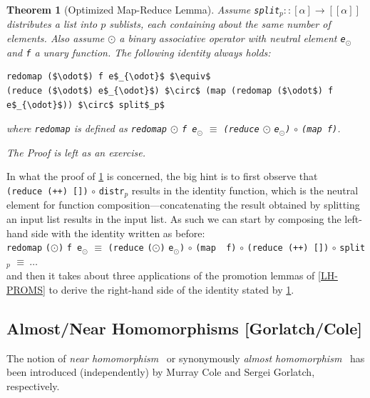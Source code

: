 \documentclass[acmsmall,review]{acmart}\settopmatter{printfolios=true,printccs=false,printacmref=false}
\newtheorem{mytheo}{Theorem}
\begin{document}
\begin{mytheo}[Optimized Map-Reduce Lemma]\label{Lemma-Map-Red}
Assume {\tt split$_p :: [\alpha] \rightarrow [[\alpha]]$}
distributes a list into $p$ sublists, each containing about 
the same number of elements. Also assume $\odot$ a binary 
associative operator with neutral element {\tt e$_{\odot}$} 
and {\tt f} a unary function. The following identity always holds:
\begin{lstlisting}[mathescape=true]
redomap ($\odot$) f e$_{\odot}$ $\equiv$
(reduce ($\odot$) e$_{\odot}$) $\circ$ (map (redomap ($\odot$) f e$_{\odot}$)) $\circ$ split$_p$
\end{lstlisting}\vspace{-2ex}

where \lstinline{redomap} is defined as
\lstinline{redomap} $\odot$ {\tt f e$_{\odot}$} $\equiv$ \lstinline{(reduce} $\odot$ {\tt e$_{\odot}$)} $\circ$ \lstinline{(map f)}.

\emph{The Proof} is left as an exercise. 
\end{mytheo}

In what the proof of \cref{Lemma-Map-Red} is concerned, the big hint is to first 
observe that\\
\lstinline{(reduce (++) [])} $\circ$  {\tt distr$_p$} results in the identity function,
which is the neutral element for function composition---concatenating the result obtained
by splitting an input list results in the input list. As such we can start
by composing the left-hand side with the identity written as before:\\
\lstinline{redomap} {\tt($\odot$)} {\tt f e$_{\odot}$} $\equiv$ \lstinline{(reduce} {\tt($\odot$)} {\tt e$_{\odot}$)} $\circ$ \lstinline{(map  f)} $\circ$ \lstinline{(reduce (++) [])} $\circ$ {\tt split$_p$} $\equiv~\ldots$\\
and then it takes about three applications of the promotion lemmas of \cref{LH-PROMS} 
to derive the right-hand side of the identity stated by \cref{Lemma-Map-Red}. 

\subsection{Almost/Near Homomorphisms [Gorlatch/Cole]}

The notion of \emph{near homomorphism}~\cite{ColeNearHom} or 
synonymously \emph{almost homomorphism}~\cite{Gorlatch:AntiUnif} 
has been introduced (independently) by Murray Cole and 
Sergei Gorlatch, respectively. 
\end{document}
